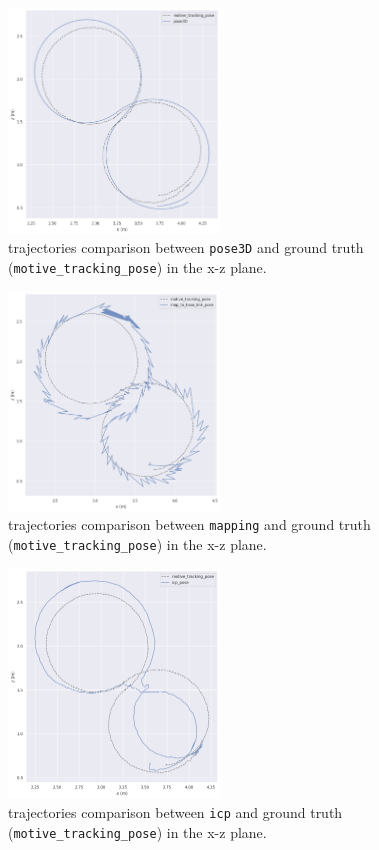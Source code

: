 \documentclass[11pt]{article}
\begin{document}
\begin{figure}[H]
    \centering
    \includegraphics[width=0.5\textwidth]{figures/evo_pose3D.png}
    \caption{trajectories comparison between \texttt{pose3D} and ground truth (\texttt{motive\_tracking\_pose}) in the x-z plane.}
    \label{fig:pose3D_traj}
\end{figure}
\begin{figure}[H]
    \centering
    \includegraphics[width=0.5\textwidth]{figures/evo_mapping.png}
    \caption{trajectories comparison between \texttt{mapping} and ground truth (\texttt{motive\_tracking\_pose}) in the x-z plane.}
    \label{fig:mapping_traj}
\end{figure}
\begin{figure}[H]
    \centering
    \includegraphics[width=0.5\textwidth]{figures/evo_icp.png}
    \caption{trajectories comparison between \texttt{icp} and ground truth (\texttt{motive\_tracking\_pose}) in the x-z plane.}
    \label{fig:icp_traj}
\end{figure}
\end{document}
